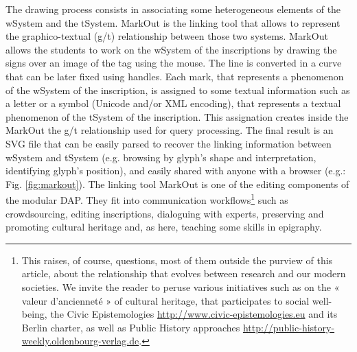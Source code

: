 \documentclass[amsthm,ebook]{saparticle}
\begin{document}
The drawing process consists in associating some heterogeneous elements of the wSystem and the tSystem. MarkOut is the
linking tool that allows to represent the graphico-textual (g/t) relationship between those two systems. MarkOut allows
the students to work on the wSystem of the inscriptions by drawing the signs over an image of the tag using the mouse.
The line is converted in a curve that can be later fixed using handles. Each mark, that represents a phenomenon of the
wSystem of the inscription, is assigned to some textual information such as a letter or a symbol (Unicode and/or XML
encoding), that represents a textual phenomenon of the tSystem of the inscription. This assignation creates inside the
MarkOut the g/t relationship used for query processing. The final result is an SVG file that can be easily parsed to
recover the linking information between wSystem and tSystem (e.g. browsing by glyph's shape and interpretation,
identifying glyph's position), and easily shared with anyone with a browser (e.g.: Fig. \ref{fig:markout}). The linking tool MarkOut
is one of the editing components of the modular DAP. They fit into communication workflows\footnote{This raises, of
course, questions, most of them outside the purview of this article, about the relationship that evolves between
research and our modern societies. We invite the reader to peruse various initiatives such as \citet{bertocci_documenter_2006} on the «
valeur d'ancienneté » of cultural heritage, that participates to social well-being, the Civic Epistemologies
\url{http://www.civic-epistemologies.eu} and its Berlin charter, as well as Public History approaches
\url{http://public-history-weekly.oldenbourg-verlag.de}.} such as crowdsourcing, editing inscriptions, dialoguing with
experts, preserving and promoting cultural heritage and, as here, teaching some skills in epigraphy.
\end{document}
